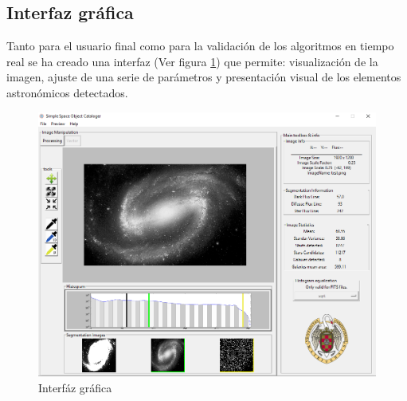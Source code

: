 	\subsection{Interfaz gráfica}\label{GUI}
	Tanto para el usuario final como para la validación de los algoritmos en tiempo real se ha creado una interfaz (Ver figura \ref{fig:GUI_limpia}) que permite: visualización de la imagen, ajuste de una serie de parámetros y presentación visual de los elementos astronómicos detectados.\\
	\begin{figure}[!htb]
		\centering
		\includegraphics[width=1\textwidth]{images/gui/general.png}
		\caption{\label{fig:GUI_limpia}Interfáz gráfica}
	\end{figure}

